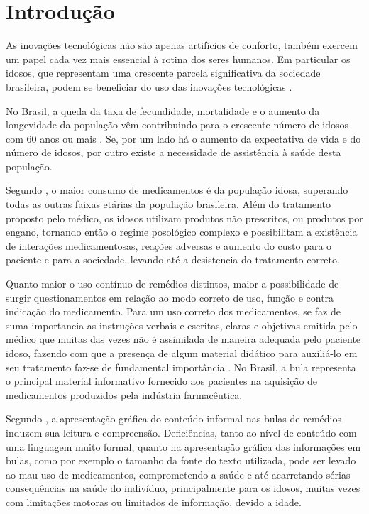 \chapter{Introdução}\label{ch:intro}

As inovações tecnológicas não são apenas artifícios de conforto, também exercem um papel cada vez mais essencial à rotina dos seres humanos. Em particular os idosos, que representam uma crescente parcela significativa da sociedade brasileira, podem se beneficiar do uso das inovações tecnológicas \cite{Goncalves2011}. 

 No Brasil, a queda da taxa de fecundidade, mortalidade e o aumento da longevidade da população vêm contribuindo para o crescente número de idosos com 60 anos ou mais \cite{IBGE2013}. Se, por um lado há o aumento da expectativa de vida e do número de idosos, por outro existe a necessidade de assistência à saúde desta população.
 
 Segundo , o maior consumo de medicamentos é da população idosa, superando todas as outras faixas etárias da população brasileira. Além do tratamento proposto pelo médico, os idosos utilizam produtos não prescritos, ou produtos por engano, tornando então o regime posológico complexo e possibilitam a existência de interações medicamentosas, reações adversas e aumento do custo para o paciente e para a sociedade, levando até a desistencia do tratamento correto.


Quanto maior o uso contínuo de remédios distintos, maior a possibilidade de surgir questionamentos em relação ao modo correto de uso, função e contra indicação do medicamento. Para um uso correto dos medicamentos, se faz de suma importancia as instruções verbais e escritas, claras e objetivas  emitida pelo médico que muitas das vezes não é assimilada de maneira adequada pelo paciente idoso, fazendo com que a presença de algum material didático para auxiliá-lo em seu tratamento faz-se de fundamental importância \cite{Didonet2007}. No Brasil, a bula representa o principal material informativo fornecido aos pacientes na aquisição de medicamentos produzidos pela indústria farmacêutica.

Segundo , a apresentação gráfica do conteúdo informal nas bulas de remédios induzem sua leitura e compreensão. Deficiências, tanto ao nível de conteúdo com uma linguagem muito formal, quanto na apresentação gráfica das informações em bulas, como por exemplo o tamanho da fonte do texto utilizada, pode ser levado ao mau uso de medicamentos, comprometendo a saúde e até acarretando sérias consequências na saúde do indivíduo, principalmente para os idosos, muitas vezes com limitações motoras ou limitados de informação, devido a idade. 

